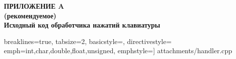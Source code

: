 \begin{center}
\textbf{
\MakeUppercase{Приложение A}\\
(рекомендуемое)\\
Исходный код обработчика нажатий клавиатуры}
\end{center}



 breaklines=true, tabsize=2, basicstyle=\small,
directivestyle={\color{black}}
emph={int,char,double,float,unsigned},
emphstyle={\color{blue}}]
{attachments/handler.cpp}
